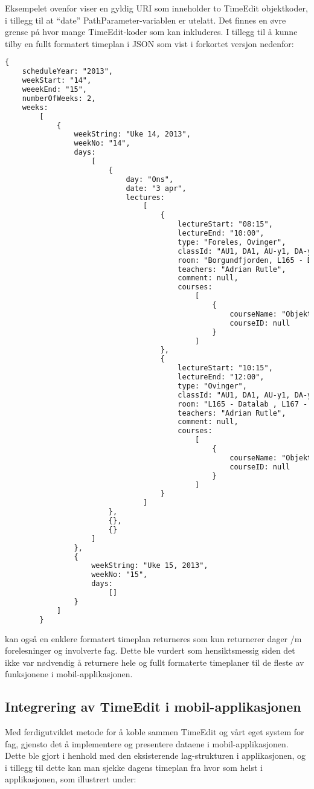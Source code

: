 \documentclass[../main.tex]{subfiles}
\begin{document}
Eksempelet ovenfor viser en gyldig URI som inneholder to TimeEdit objektkoder, i tillegg til at “date” PathParameter-variablen er utelatt. Det finnes en øvre grense på hvor mange TimeEdit-koder som kan inkluderes.\newline
\newline
I tillegg til å kunne tilby en fullt formatert timeplan i JSON som vist i forkortet versjon nedenfor:

\begin{lstlisting}[language=HTML, frame=single, caption={asdasdsadasdasdasdsadsadasdasdsadsa}]
{
	scheduleYear: "2013",
	weekStart: "14",
	weeekEnd: "15",
	numberOfWeeks: 2,
	weeks: 
		[
			{
				weekString: "Uke 14, 2013",
				weekNo: "14",
				days: 
					[
						{
							day: "Ons",
							date: "3 apr",
							lectures: 
								[
									{
										lectureStart: "08:15",
										lectureEnd: "10:00",
										type: "Foreles, Ovinger",
										classId: "AU1, DA1, AU-y1, DA-y1",
										room: "Borgundfjorden, L165 - Datalab , L167 - Prosjektrom",
										teachers: "Adrian Rutle",
										comment: null,
										courses: 
											[
												{
													courseName: "Objektorientert programmering",
													courseID: null
												}
											]
									},
									{
										lectureStart: "10:15",
										lectureEnd: "12:00",
										type: "Ovinger",
										classId: "AU1, DA1, AU-y1, DA-y1",
										room: "L165 - Datalab , L167 - Prosjektrom",
										teachers: "Adrian Rutle",
										comment: null,
										courses: 
											[
												{
													courseName: "Objektorientert programmering",
													courseID: null
												}
											]
									}
								]
						},
						{},
						{}
					]
				},
				{
					weekString: "Uke 15, 2013",
					weekNo: "15",
					days: 
						[]
				}
			]
		}
\end{lstlisting}

kan også en enklere formatert timeplan returneres som kun returnerer dager /m forelesninger og involverte fag. Dette ble vurdert som hensiktsmessig siden det ikke var nødvendig å returnere hele og fullt formaterte timeplaner til de fleste av funksjonene i mobil-applikasjonen. 

\subsection{Integrering av TimeEdit i mobil-applikasjonen}

Med ferdigutviklet metode for å koble sammen TimeEdit og vårt eget system for fag, gjensto det å implementere og presentere dataene i mobil-applikasjonen. Dette ble gjort i henhold med den eksisterende lag-strukturen i applikasjonen, og i tillegg til dette kan man sjekke dagens timeplan fra hvor som helst i applikasjonen, som illustrert under:
\end{document}
